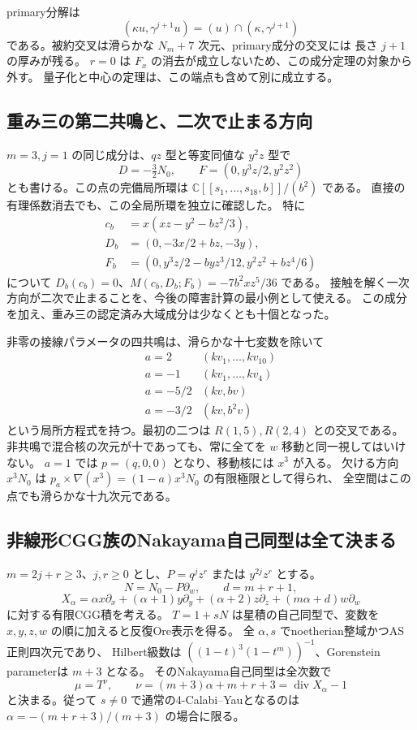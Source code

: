 primary分解は
\[
 (\kappa u,\gamma^{j+1}u)=(u)\cap(\kappa,\gamma^{j+1})
\]
である。被約交叉は滑らかな $N_m+7$ 次元、primary成分の交叉には
長さ $j+1$ の厚みが残る。
$r=0$ は $F_x$ の消去が成立しないため、この成分定理の対象から外す。
量子化と中心の定理は、この端点も含めて別に成立する。

\subsection{重み三の第二共鳴と、二次で止まる方向}

$m=3,j=1$ の同じ成分は、$qz$ 型と等変同値な $y^2z$ 型で
\[
 D=-\tfrac32N_0,\qquad F=(0,y^3z/2,y^2z^2)
\]
とも書ける。この点の完備局所環は
$\mathbb C[[s_1,\ldots,s_{18},b]]/(b^2)$ である。
直接の有理係数消去でも、この全局所環を独立に確認した。
特に
\[
 \begin{split}
 c_b&=x(xz-y^2-bz^2/3),\\
 D_b&=(0,-3x/2+bz,-3y),\\
 F_b&=(0,y^3z/2-byz^3/12,y^2z^2+bz^4/6)
 \end{split}
\]
について $D_b(c_b)=0$、$M(c_b,D_b;F_b)=-7b^2xz^5/36$ である。
接触を解く一次方向が二次で止まることを、今後の障害計算の最小例として使える。
この成分を加え、重み三の認定済み大域成分は少なくとも十個となった。

非零の接線パラメータの四共鳴は、滑らかな十七変数を除いて
\[
 \begin{array}{c|c}
 a=2&(kv_1,\ldots,kv_{10})\\
 a=-1&(kv_1,\ldots,kv_4)\\
 a=-5/2&(kv,bv)\\
 a=-3/2&(kv,b^2v)
 \end{array}
\]
という局所方程式を持つ。最初の二つは $R(1,5),R(2,4)$ との交叉である。
非共鳴で混合核の次元が十であっても、常に全てを $w$ 移動と同一視してはいけない。
$a=1$ では $p=(q,0,0)$ となり、移動核には $x^3$ が入る。
欠ける方向 $x^3N_0$ は
$p_a\times\nabla(x^3)=(1-a)x^3N_0$ の有限極限として得られ、
全空間はこの点でも滑らかな十九次元である。

\subsection{非線形CGG族のNakayama自己同型は全て決まる}

$m=2j+r\ge3$、$j,r\ge0$ とし、$P=q^jz^r$ または $y^{2j}z^r$ とする。
\[
 N=N_0-P\partial_w,\qquad d=m+r+1,
\]
\[
 X_\alpha=\alpha x\partial_x+(\alpha+1)y\partial_y+(\alpha+2)z\partial_z
                   +(m\alpha+d)w\partial_w
\]
に対する有限CGG積を考える。
$T=1+sN$ は星積の自己同型で、変数を $x,y,z,w$ の順に加えると反復Ore表示を得る。
全 $\alpha,s$ でnoetherian整域かつAS正則四次元であり、
Hilbert級数は $((1-t)^3(1-t^m))^{-1}$、Gorenstein parameterは $m+3$ となる。
そのNakayama自己同型は全次数で
\[
 \boxed{\mu=T^\nu,\qquad \nu=(m+3)\alpha+m+r+3=\operatorname{div}X_\alpha-1}
\]
と決まる。従って $s\ne0$ で通常の4-Calabi--Yauとなるのは
$\alpha=-(m+r+3)/(m+3)$ の場合に限る。

